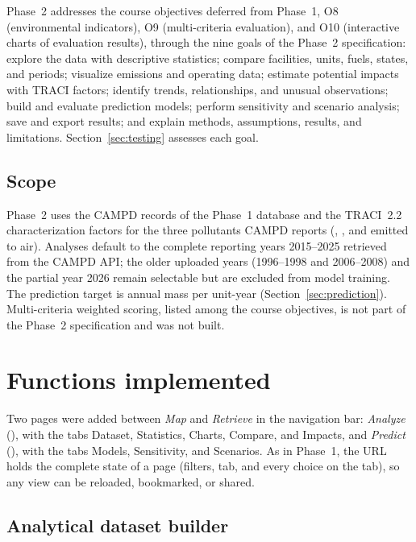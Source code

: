 \documentclass[11pt,a4paper]{article}
\begin{document}
Phase~2 addresses the course objectives deferred from Phase~1, O8 (environmental indicators),
O9 (multi-criteria evaluation), and O10 (interactive charts of evaluation results), through the
nine goals of the Phase~2 specification: explore the data with descriptive statistics; compare
facilities, units, fuels, states, and periods; visualize emissions and operating data; estimate
potential impacts with TRACI factors; identify trends, relationships, and unusual observations;
build and evaluate prediction models; perform sensitivity and scenario analysis; save and export
results; and explain methods, assumptions, results, and limitations. Section~\ref{sec:testing}
assesses each goal.

\subsection{Scope}

Phase~2 uses the CAMPD records of the Phase~1 database and the TRACI~2.2 characterization
factors for the three pollutants CAMPD reports (\COtwo{}, \SOtwo{}, and \NOx{} emitted to air).
Analyses default to the complete reporting years 2015--2025 retrieved from the CAMPD API; the
older uploaded years (1996--1998 and 2006--2008) and the partial year 2026 remain selectable but
are excluded from model training. The prediction target is annual \NOx{} mass per unit-year
(Section~\ref{sec:prediction}). Multi-criteria weighted scoring, listed among the course
objectives, is not part of the Phase~2 specification and was not built.

\section{Functions implemented}
\label{sec:functions}

Two pages were added between \emph{Map} and \emph{Retrieve} in the navigation bar:
\emph{Analyze} (), with the tabs Dataset, Statistics, Charts, Compare, and
Impacts, and \emph{Predict} (), with the tabs Models, Sensitivity, and Scenarios.
As in Phase~1, the URL holds the complete state of a page (filters, tab, and every choice on the
tab), so any view can be reloaded, bookmarked, or shared.

\subsection{Analytical dataset builder}
\end{document}
